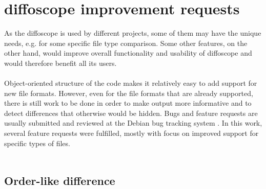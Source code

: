 \chapter{diffoscope improvement requests}


As the diffoscope is used by different projects, some of them may have the unique needs, e.g. for some specific file type comparison.
Some other features, on the other hand, would improve overall functionality and usability of diffoscope and would therefore benefit all its users.\\\\
Object-oriented structure of the code makes it relatively easy to add support for
new file formats.
However, even for the file formats that are already supported, there is still work
to be done in order to make output more informative and to detect differences that
otherwise would be hidden.
Bugs and feature requests are usually submitted and reviewed at the Debian bug tracking system \autocite{dfs-bugs}.
In this work, several feature requests were fulfilled, mostly with focus on improved support for specific types of files.\\\\


\section[Order-like difference]{Order-like difference}

